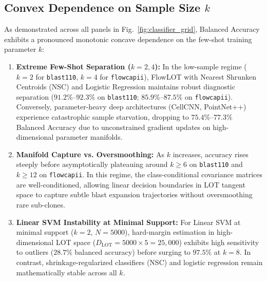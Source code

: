\documentclass[10pt,journal,compsoc]{IEEEtran}
\begin{document}
\subsection{Convex Dependence on Sample Size \texorpdfstring{$k$}{k}}
As demonstrated across all panels in Fig.~\ref{fig:classifier_grid}, Balanced Accuracy exhibits a pronounced monotonic concave dependence on the few-shot training parameter $k$:
\begin{enumerate}
    \item \textbf{Extreme Few-Shot Separation ($k=2, 4$):} In the low-sample regime ($k=2$ for \texttt{blast110}, $k=4$ for \texttt{flowcapii}), FlowLOT with Nearest Shrunken Centroids (NSC) and Logistic Regression maintains robust diagnostic separation ($91.2\%\text{--}92.3\%$ on \texttt{blast110}; $85.9\%\text{--}87.5\%$ on \texttt{flowcapii}). Conversely, parameter-heavy deep architectures (CellCNN, PointNet++) experience catastrophic sample starvation, dropping to $75.4\%\text{--}77.3\%$ Balanced Accuracy due to unconstrained gradient updates on high-dimensional parameter manifolds.
    \item \textbf{Manifold Capture vs. Oversmoothing:} As $k$ increases, accuracy rises steeply before asymptotically plateauing around $k \ge 6$ on \texttt{blast110} and $k \ge 12$ on \texttt{flowcapii}. In this regime, the class-conditional covariance matrices are well-conditioned, allowing linear decision boundaries in LOT tangent space to capture subtle blast expansion trajectories without oversmoothing rare sub-clones.
    \item \textbf{Linear SVM Instability at Minimal Support:} For Linear SVM at minimal support ($k=2$, $N=5000$), hard-margin estimation in high-dimensional LOT space ($D_{\text{LOT}} = 5000 \times 5 = 25,000$) exhibits high sensitivity to outliers ($28.7\%$ balanced accuracy) before surging to $97.5\%$ at $k=8$. In contrast, shrinkage-regularized classifiers (NSC) and logistic regression remain mathematically stable across all $k$.
\end{enumerate}
\end{document}
